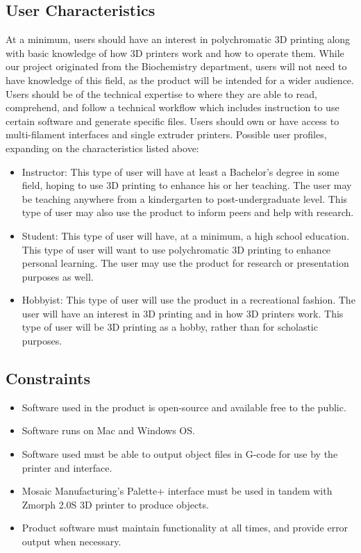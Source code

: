 \documentclass[letterpaper, onecolumn, draftclsnofoot, 10pt, compsoc]{IEEEtran}
\begin{document}
\subsection{User Characteristics} %
At a minimum, users should have an interest in polychromatic 3D printing along with basic knowledge of how 3D printers work and how to operate them. 
While our project originated from the Biochemistry department, users will not need to have knowledge of this field, as the product will be intended for a wider audience.
Users should be of the technical expertise to where they are able to read, comprehend, and follow a technical workflow which includes instruction to use certain software and generate specific files. 
Users should own or have access to multi-filament interfaces and single extruder printers. 
Possible user profiles, expanding on the characteristics listed above:
\begin{itemize}
	\item Instructor: This type of user will have at least a Bachelor's degree in some field, hoping to use 3D printing to enhance his or her teaching. 
    The user may be teaching anywhere from a kindergarten to post-undergraduate level. 
    This type of user may also use the product to inform peers and help with research.
    \item Student: This type of user will have, at a minimum, a high school education. 
    This type of user will want to use polychromatic 3D printing to enhance personal learning. 
    The user may use the product for research or presentation purposes as well. 
    \item Hobbyist: This type of user will use the product in a recreational fashion.
    The user will have an interest in 3D printing and in how 3D printers work. 
    This type of user will be 3D printing as a hobby, rather than for scholastic purposes. 
\end{itemize}

\subsection{Constraints} %
\begin{itemize}
	\item Software used in the product is open-source and available free to the public.
    \item Software runs on Mac and Windows OS.
    \item Software used must be able to output object files in G-code for use by the printer and interface.
    \item Mosaic Manufacturing's Palette+ interface must be used in tandem with Zmorph 2.0S 3D printer to produce objects.
    \item Product software must maintain functionality at all times, and provide error output when necessary. 
\end{itemize}
\end{document}
